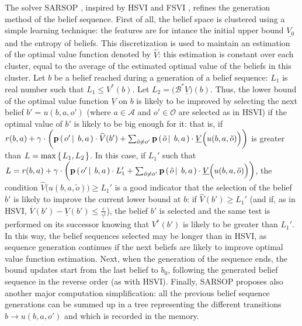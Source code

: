 The solver SARSOP \cite{Kurniawati-RSS08}, inspired by HSVI and FSVI \cite{shani}, 
refines the generation method of the belief sequence. 
First of all, the belief space is clustered using a simple learning technique:
the features are for intance the initial upper bound 
$\underline{V_0}$ and the entropy of beliefs.
This discretization is used to maintain an estimation of the optimal value function denoted by $\widehat{V}$:
this estimation is constant over each cluster, equal to 
the average of the estimated optimal value of the beliefs in this cluster.
Let $b$ be a belief reached during a generation of a belief sequence:
$L_1$ is real number such that $L_1 \leqslant V^*(b)$.
Let $L_2 = \Big( \mathcal{B}^* \underline{V} \Big)(b)$. 
Thus, the lower bound of the optimal value function $\underline{V}$ on $b$
is likely to be improved by selecting the next belief $b'=u(b,a,o')$ 
(where $a \in \mathcal{A}$ and $o' \in \mathcal{O}$ are selected as in HSVI)
if the optimal value of $b'$ is likely to be big enough for it:
that is, if $r(b,a) + \gamma \cdot \bigg( \textbf{p} \left( \left.  o' \, \right| \left. \, b,a  \right. \right) \cdot \widehat{V}(b') + \sum_{\tilde{o} \neq o'} \textbf{p} \left( \left.  \tilde{o} \, \right| \left. \, b,a  \right. \right) \cdot \underline{V}\Big(u(b,a,\tilde{o})\Big) \bigg)$ is greater than $L = \max \left\{ \left.  L_1, L_2  \right. \right\}$.
In this case, if $L_1'$ such that $L = r(b,a) + \gamma \cdot \bigg( \textbf{p} \left( \left.  o' \, \right| \left. \, b,a  \right. \right) \cdot L_1' + \sum_{\tilde{o} \neq o'} \textbf{p} \left( \left.  \tilde{o} \, \right| \left. \, b,a  \right. \right) \cdot \underline{V}\Big(u(b,a,\tilde{o})\Big) \bigg)$, 
the condition $\widehat{V}\Big(u(b,a,\tilde{o})\Big) \geqslant L_1'$ 
is a good indicator that the selection of the belief $b'$ is likely to improve the current lower bound at $b$:
if $\widehat{V}(b') \geqslant L_1'$ (and if, as in HSVI, $\overline{V}(b') - \underline{V}(b') \leqslant \frac{\varepsilon}{\gamma^t}$), 
the belief $b'$ is selected and the same test is performed on its successor knowing that $V^*(b')$ is likely to be greater than $L_1'$.
In this way, the belief sequences selected may be longer than in HSVI,
as sequence generation continues if the next beliefs are likely to improve optimal value function estimation. 
Next, when the generation of the sequence ends, 
the bound updates start from the last belief to $b_0$, 
following the generated belief sequence
in the reverse order (as with HSVI).
Finally, SARSOP proposes also another major computation simplification:
all the previous belief sequence generations can be summed up  
in a tree representing the different transitions $b \rightarrow u(b,a,o')$
and which is recorded in the memory. 

